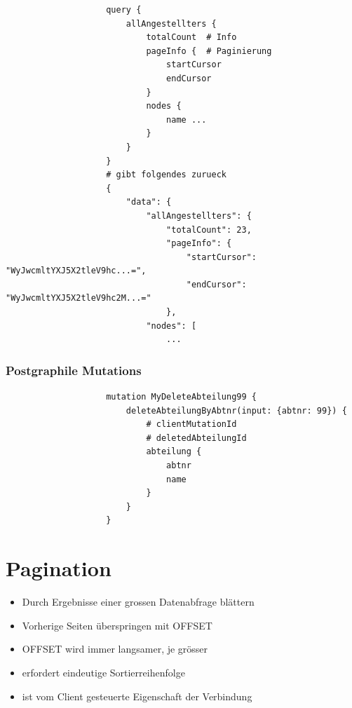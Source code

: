 \documentclass[a4paper, landscape, 8pt]{scrartcl}
\begin{document}
\begin{multicols*}{4}
        \begin{lstlisting}
                    query {
                        allAngestellters {
                            totalCount  # Info
                            pageInfo {  # Paginierung
                                startCursor
                                endCursor
                            }
                            nodes {
                                name ...
                            }
                        }
                    }
                    # gibt folgendes zurueck
                    {
                        "data": {
                            "allAngestellters": {
                                "totalCount": 23,
                                "pageInfo": {
                                    "startCursor": "WyJwcmltYXJ5X2tleV9hc...=",
                                    "endCursor": "WyJwcmltYXJ5X2tleV9hc2M...="
                                },
                            "nodes": [
                                ...
        \end{lstlisting}

        \subsubsection{Postgraphile Mutations}
        \begin{lstlisting}
                    mutation MyDeleteAbteilung99 {
                        deleteAbteilungByAbtnr(input: {abtnr: 99}) {
                            # clientMutationId
                            # deletedAbteilungId
                            abteilung {
                                abtnr
                                name
                            }
                        }
                    }
        \end{lstlisting}

        \section{Pagination}
        \begin{itemize}
            \item Durch Ergebnisse einer grossen Datenabfrage blättern
            \item Vorherige Seiten überspringen mit OFFSET
            \item OFFSET wird immer langsamer, je grösser
            \item erfordert eindeutige Sortierreihenfolge
            \item ist vom Client gesteuerte Eigenschaft der Verbindung
        \end{itemize}


\end{multicols*}
\end{document}
